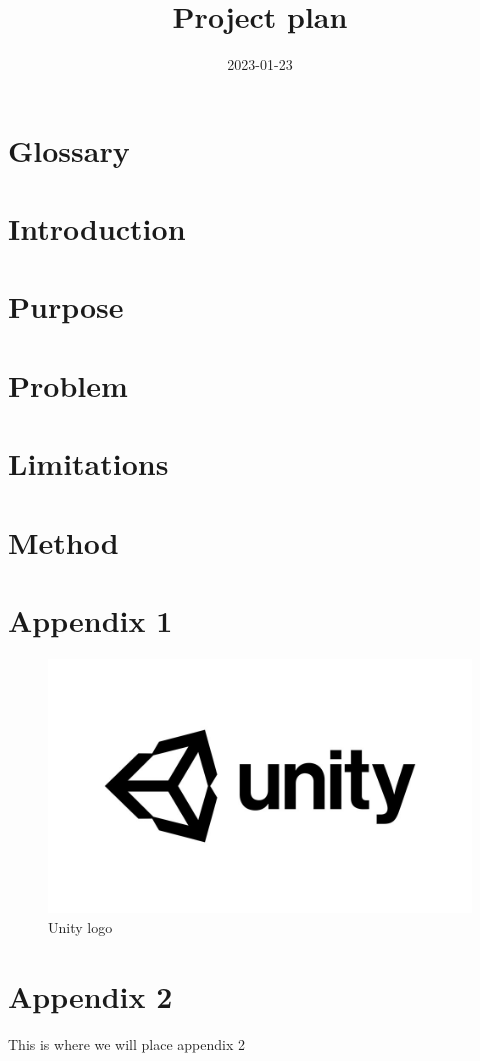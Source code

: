 \documentclass[titlepage]{article}
\title{%
    \Huge Project plan
}
\date{2023-01-23}
\begin{document}
\maketitle
\newpage

\tableofcontents
\thispagestyle{plain}
\newpage

\section*{Glossary}
    
\thispagestyle{plain}
\newpage

\section{Introduction}
    

\section{Purpose}
    

\section{Problem}
    

\section{Limitations}
    

\section{Method}
    




\appendix
    \section{Appendix 1}
        \begin{figure}[H]
        \centering
        \includegraphics[scale=0.2]{appendix/Unity.jpg}
        \caption{Unity logo}
        \label{fig:unity}
    \end{figure}

    \section{Appendix 2}
        This is where we will place appendix 2
\end{document}
